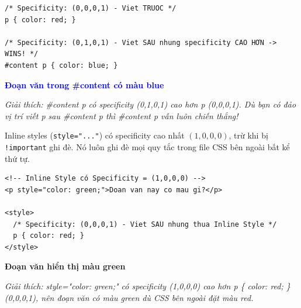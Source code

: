 \documentclass[11pt,oneside]{book}
\newcommand{\codeinline}[1]{\textcolor{accentOrange}{\texttt{#1}}}
\begin{document}
\begin{codeWindow}
\begin{lstlisting}[language=CSS3]
/* Specificity: (0,0,0,1) - Viet TRUOC */
p { color: red; }

/* Specificity: (0,1,0,1) - Viet SAU nhung specificity CAO HƠN -> WINS! */
#content p { color: blue; }
\end{lstlisting}
\end{codeWindow}

\begin{browserWindow}
\sffamily\small
\textcolor{blue}{\textbf{Đoạn văn trong \#content có màu blue}} \par\vspace{4pt}
{\scriptsize\textcolor{gray!60}{\textit{Giải thích: \#content p có specificity (0,1,0,1) cao hơn p (0,0,0,1). Dù bạn có đảo vị trí viết p sau \#content p thì \#content p vẫn luôn chiến thắng!}}}
\end{browserWindow}

\begin{warnBox}
Inline styles (\codeinline{style="..."}) có specificity cao nhất $(1,0,0,0)$, trừ khi bị \codeinline{!important} ghi đè. Nó luôn ghi đè mọi quy tắc trong file CSS bên ngoài bất kể thứ tự.
\end{warnBox}

\begin{codeWindow}
\begin{lstlisting}[language=HTML5]
<!-- Inline Style có Specificity = (1,0,0,0) -->
<p style="color: green;">Doan van nay co mau gi?</p>

<style>
  /* Specificity: (0,0,0,1) - Viet SAU nhung thua Inline Style */
  p { color: red; }
</style>
\end{lstlisting}
\end{codeWindow}

\begin{browserWindow}
\sffamily\small
\textcolor{green!60!black}{\textbf{Đoạn văn hiển thị màu green}} \par\vspace{4pt}
{\scriptsize\textcolor{gray!60}{\textit{Giải thích: style="color: green;" có specificity (1,0,0,0) cao hơn p \{ color: red; \} (0,0,0,1), nên đoạn văn có màu green dù CSS bên ngoài đặt màu red.}}}
\end{browserWindow}
\end{document}
